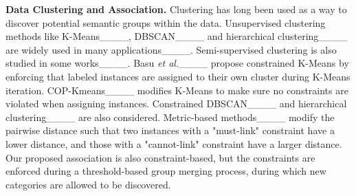 \noindent\textbf{Data Clustering and Association.}
Clustering has long been used as a way to discover potential semantic groups within the data. Unsupervised clustering methods like K-Means____, DBSCAN____ and hierarchical clustering____ are widely used in many applications____. Semi-supervised clustering is also studied in some works____. Basu \textit{et al.}____ propose constrained K-Means by enforcing that labeled instances are assigned to their own cluster during K-Means iteration. COP-Kmeans____ modifies K-Means to make sure no constraints are violated when assigning instances. Constrained DBSCAN____ and hierarchical clustering____ are also considered. Metric-based methods____ modify the pairwise distance such that two instances with a "must-link" constraint have a lower distance, and those with a "cannot-link" constraint have a larger distance. Our proposed association is also constraint-based, but the constraints are enforced during a threshold-based group merging process, during which new categories are allowed to be discovered.
